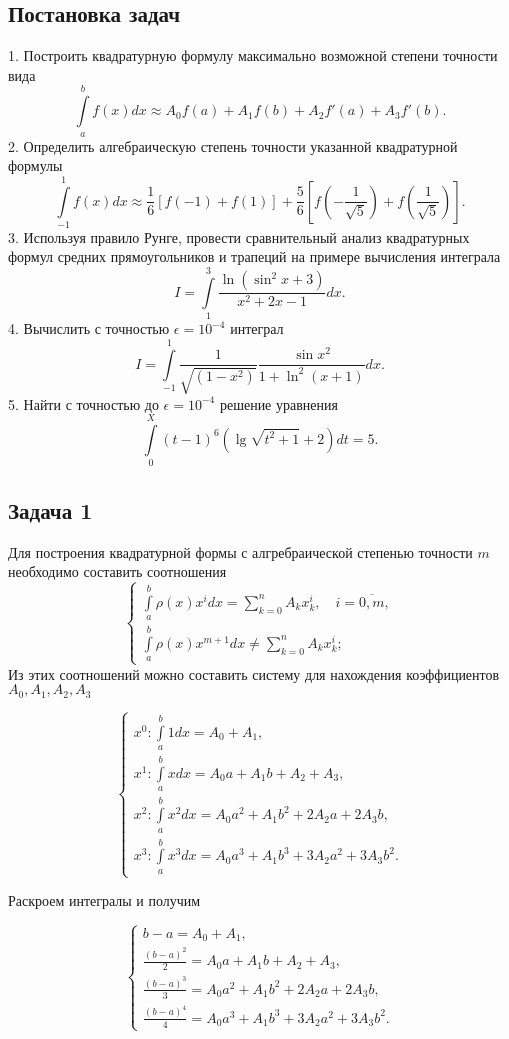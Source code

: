 \documentclass[11pt]{article}
\begin{document}
\subsection*{Постановка задач} 1. Построить квадратурную формулу
максимально возможной степени точности вида
\[\int\limits_a^b f(x)dx \approx A_0 f(a) + A_1 f(b) + A_2 f'(a) + A_3 f'(b).\]
2. Определить алгебраическую степень точности указанной квадратурной
формулы
\[\int\limits_{-1}^1 f(x)dx \approx \dfrac{1}{6}[f(-1) + f(1)] + \dfrac{5}{6}[f(-\dfrac{1}{\sqrt5}) + f(\dfrac{1}{\sqrt5})].\]
3. Используя правило Рунге, провести сравнительный анализ квадратурных
формул средних прямоугольников и трапеций на примере вычисления
интеграла \[I = \int\limits_1^3 \dfrac{\ln(\sin^2x + 3)}{x^2+2x-1}dx.\]
4. Вычислить с точностью \(\epsilon = 10^{-4}\) интеграл
\[I = \int\limits_{-1}^1 \frac{1}{\sqrt{(1-x^2)}} \dfrac{\sin x^2}{1 + \ln^2(x+1)}dx.\]
5. Найти с точностью до \(\epsilon = 10^{-4}\) решение уравнения
\[\int\limits_{0}^X (t-1)^6 (\lg \sqrt{t^2 + 1} + 2)dt = 5. \]

    \subsection*{Задача 1}

Для построения квадратурной формы с алгребраической степенью точности
\(m\) необходимо составить соотношения $$
\begin{cases}
\int\limits_a^b \rho(x) x^idx = \sum\limits_{k=0}^{n}A_kx^i_k,\quad i=\overline{0,m},\\
\int\limits_a^b \rho(x) x^{m+1}dx \ne \sum\limits_{k=0}^{n}A_kx^i_k;
\end{cases}$$ Из этих соотношений можно составить систему для
нахождения коэффициентов \(A_0, A_1, A_2, A_3\)

$$\begin{cases}
x^0: \int\limits_a^b 1 dx = A_0 + A_1,\\
x^1: \int\limits_a^b x dx = A_0a + A_1b + A_2 + A_3, \\
x^2: \int\limits_a^b x^2 dx = A_0a^2 + A_1b^2 + 2A_2a + 2A_3b,\\
x^3: \int\limits_a^b x^3 dx = A_0a^3 + A_1b^3 + 3A_2a^2 + 3A_3b^2.
\end{cases}$$

Раскроем интегралы и получим

$$\begin{cases}
b-a = A_0 + A_1,\\
\frac{(b-a)^2}{2} = A_0a + A_1b + A_2 + A_3, \\
\frac{(b-a)^3}{3} = A_0a^2 + A_1b^2 + 2A_2a + 2A_3b,\\
\frac{(b-a)^4}{4} = A_0a^3 + A_1b^3 + 3A_2a^2 + 3A_3b^2.
\end{cases}$$
\end{document}
